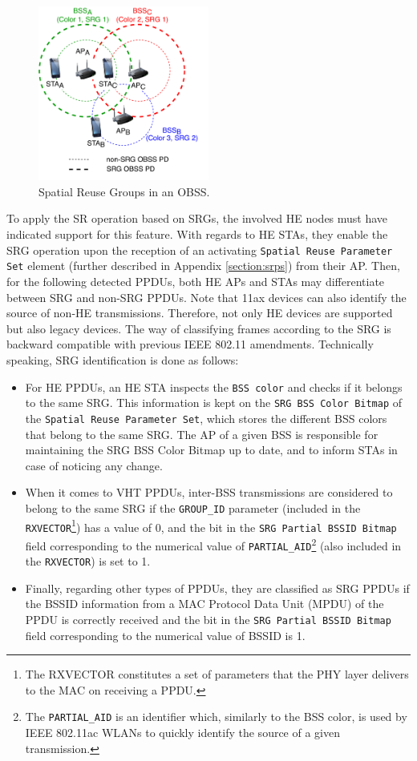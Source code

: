 \documentclass{article}
\begin{document}
\begin{figure}[ht!]
	\centering
	\includegraphics[width=0.5\textwidth]{fig_6}
	\caption{Spatial Reuse Groups in an OBSS.}
	\label{fig:fig_6}
\end{figure}

To apply the SR operation based on SRGs, the involved HE nodes must have indicated support for this feature. With regards to HE STAs, they enable the SRG operation upon the reception of an activating \texttt{Spatial Reuse Parameter Set} element (further described in Appendix \ref{section:srps}) from their AP. Then, for the following detected PPDUs, both HE APs and STAs may differentiate between SRG and non-SRG PPDUs. Note that 11ax devices can also identify the source of non-HE transmissions. Therefore, not only HE devices are supported but also legacy devices. The way of classifying frames according to the SRG is backward compatible with previous IEEE 802.11 amendments. Technically speaking, SRG identification is done as follows:
\begin{itemize}
	\item For HE PPDUs, an HE STA inspects the \texttt{BSS color} and checks if it belongs to the same SRG. This information is kept on the \texttt{SRG BSS Color Bitmap} of the \texttt{Spatial Reuse Parameter Set}, which stores the different BSS colors that belong to the same SRG. The AP of a given BSS is responsible for maintaining the SRG BSS Color Bitmap up to date, and to inform STAs in case of noticing any change.
	\item When it comes to VHT PPDUs, inter-BSS transmissions are considered to belong to the same SRG if the \texttt{GROUP\_ID} parameter (included in the \texttt{RXVECTOR}\footnote{The RXVECTOR constitutes a set of parameters that the PHY layer delivers to the MAC on receiving a PPDU.}) has a value of 0, and the bit in the \texttt{SRG Partial BSSID Bitmap} field corresponding to the numerical value of \texttt{PARTIAL\_AID}\footnote{The \texttt{PARTIAL\_AID} is an identifier which, similarly to the BSS color, is used by IEEE 802.11ac WLANs to quickly identify the source of a given transmission.} (also included in the \texttt{RXVECTOR}) is set to 1. 
	\item Finally, regarding other types of PPDUs, they are classified as SRG PPDUs if the BSSID information from a MAC Protocol Data Unit (MPDU) of the PPDU is correctly received and the bit in the \texttt{SRG Partial BSSID Bitmap} field corresponding to the numerical value of BSSID is 1.
\end{itemize}
\end{document}
